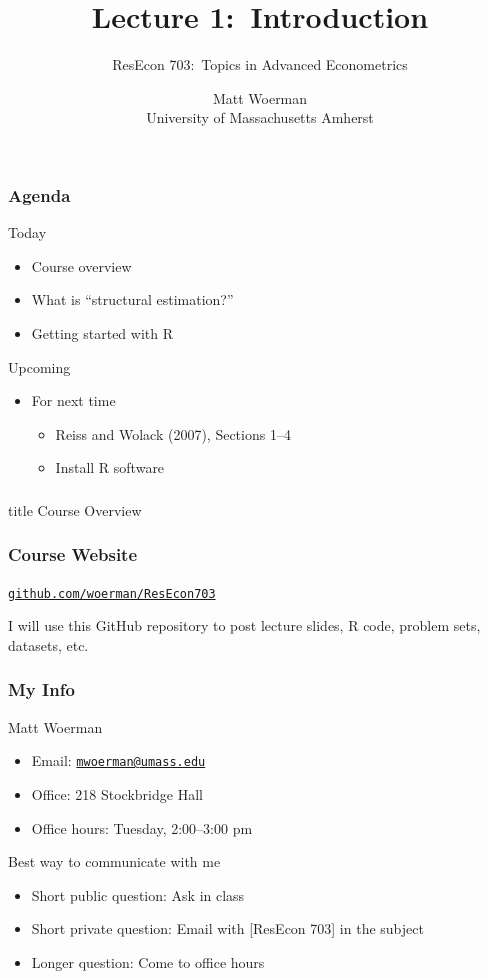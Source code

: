 \documentclass{beamer}
\title[Lecture 1:\ Introduction]{Lecture 1:\ Introduction}
\author[ResEcon 703:\ Advanced Econometrics]{ResEcon 703:\ Topics in Advanced Econometrics}
\date{Matt Woerman\\University of Massachusetts Amherst}
\begin{document}
{ 
\begin{frame}[noframenumbering]
    \titlepage
\end{frame}
}

\begin{frame}\frametitle{Agenda}
    Today
    \begin{itemize}
        \item Course overview
        \item What is ``structural estimation?''
        \item Getting started with R
    \end{itemize}
    \vspace{3ex}
    Upcoming
    \begin{itemize}
        \item For next time
        \begin{itemize}
            \item Reiss and Wolack (2007), Sections 1--4
            \item Install R software
        \end{itemize}
    \end{itemize}
\end{frame}

\begin{frame}\frametitle{}
    \vfill
    \centering
    \begin{beamercolorbox}[center]{title}
        \Large Course Overview
    \end{beamercolorbox}
    \vfill
\end{frame}

\begin{frame}\frametitle{Course Website}
    \begin{center}
        \href{https://github.com/woerman/ResEcon703}{\texttt{github.com/woerman/ResEcon703}}
    \end{center}
    \vspace{3ex}
    I will use this GitHub repository to post lecture slides, R code, problem sets, datasets, etc.
\end{frame}

\begin{frame}\frametitle{My Info}
    Matt Woerman
    \begin{itemize}
        \item Email: \href{mailton:mwoerman@umass.edu}{\texttt{mwoerman@umass.edu}}
        \item Office: 218 Stockbridge Hall
        \item Office hours: Tuesday, 2:00--3:00 pm
    \end{itemize}
    \vspace{3ex}
    Best way to communicate with me
    \begin{itemize}
        \item Short public question: Ask in class
        \item Short private question: Email with [ResEcon 703] in the subject
        \item Longer question: Come to office hours
    \end{itemize}
\end{frame}
\end{document}
